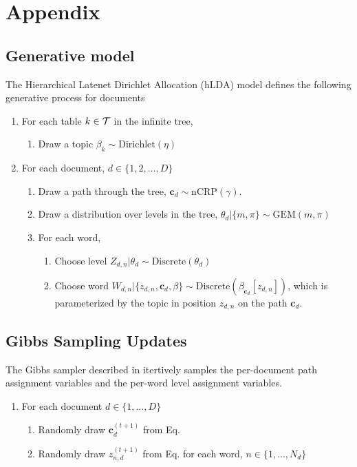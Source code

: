 \documentclass{article}
\begin{document}



\newpage
\section*{Appendix}

\subsection*{Generative model}
The Hierarchical Latenet Dirichlet Allocation (hLDA) model defines the following generative process for documents
\begin{enumerate}
  \item For each table $ k \in \cal{T}$ in the infinite tree,
  \begin{enumerate}
    \item Draw a topic $\beta_k \sim \text{Dirichlet}(\eta)$
  \end{enumerate}
  \item For each document, $d \in \{1, 2, \dots , D\}$
    \begin{enumerate}
      \item Draw a path through the tree, $\mathbf{c}_d \sim \text{nCRP}(\gamma)$.
      \item Draw a distribution over levels in the tree, $\theta_d | \{m, \pi\} \sim \text{GEM}(m, \pi)$
      \item For each word,
        \begin{enumerate}
          \item Choose level $Z_{d,n} | \theta_d \sim \text{Discrete}(\theta_d)$
          \item Choose word $W_{d,n} | \{ z_{d,n}, \mathbf{c}_d, \beta \} \sim \text{Discrete}(\beta_{\mathbf{c}_d}[z_{d,n}])$, which is parameterized by the topic in position $z_{d,n}$ on the path $\mathbf{c}_d$.
        \end{enumerate}
    \end{enumerate}
\end{enumerate}

\subsection*{Gibbs Sampling Updates}
The Gibbs sampler described in \citet{Blei2010} itertively samples the per-document path assignment variables and the per-word level assignment variables. 
\begin{enumerate}
  \item For each document $d \in \{ 1, \dots , D\}$
  \begin{enumerate}
    \item Randomly draw $\mathbf{c}_d^{(t+1)}$ from Eq. \citet{eq1}
    \item Randomly draw $z_{n,d}^{(t+1)}$ from Eq. \citet{eq2} for each word, $n \in \{1, \dots , N_d\}$
  \end{enumerate}
\end{enumerate}
\end{document}

